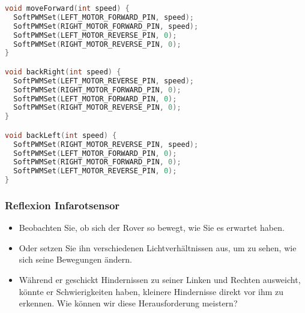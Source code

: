 \documentclass{vorlage-design-main}
\begin{document}
\begin{lstlisting}[language={C++}]
void moveForward(int speed) {
  SoftPWMSet(LEFT_MOTOR_FORWARD_PIN, speed);
  SoftPWMSet(RIGHT_MOTOR_FORWARD_PIN, speed);
  SoftPWMSet(LEFT_MOTOR_REVERSE_PIN, 0);
  SoftPWMSet(RIGHT_MOTOR_REVERSE_PIN, 0);
}

void backRight(int speed) {
  SoftPWMSet(LEFT_MOTOR_REVERSE_PIN, speed);
  SoftPWMSet(RIGHT_MOTOR_FORWARD_PIN, 0);
  SoftPWMSet(LEFT_MOTOR_FORWARD_PIN, 0);
  SoftPWMSet(RIGHT_MOTOR_REVERSE_PIN, 0);
}

void backLeft(int speed) {
  SoftPWMSet(RIGHT_MOTOR_REVERSE_PIN, speed);
  SoftPWMSet(LEFT_MOTOR_FORWARD_PIN, 0);
  SoftPWMSet(RIGHT_MOTOR_FORWARD_PIN, 0);
  SoftPWMSet(LEFT_MOTOR_REVERSE_PIN, 0);
}
\end{lstlisting}

\hypertarget{reflexion-infarotsensor}{%
\subsubsection{Reflexion Infarotsensor}\label{reflexion-infarotsensor}}

\begin{itemize}
\item
  Beobachten Sie, ob sich der Rover so bewegt, wie Sie es erwartet
  haben.
\item
  Oder setzen Sie ihn verschiedenen Lichtverhältnissen aus, um zu sehen,
  wie sich seine Bewegungen ändern.
\item
  Während er geschickt Hindernissen zu seiner Linken und Rechten
  ausweicht, könnte er Schwierigkeiten haben, kleinere Hindernisse
  direkt vor ihm zu erkennen. Wie können wir diese Herausforderung
  meistern?
\end{itemize} %


\clearpage
\printbibliography
\end{document}
